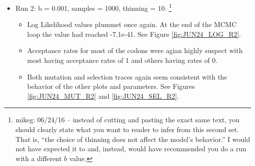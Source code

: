 \documentclass[11pt]{labbook}
\begin{document}
\begin{itemize}
        \begin{itemize}
            \item Log Likelihood values plummet once again. At the end of the MCMC loop the value had reached -1.8e-40. See Figure \ref{fig:JUN24_LOG_R1}.\footnote{mikeg: 06/24/16 -- You should use the \textbackslash label\{\} and \textbackslash ref\{\} commands rather than labeling and referring to figures using hard coded numbers.}
            \item Acceptance rates for most of the codons were highly suspect with most having acceptance rates of 1 and others having rates of 0.
            \item Both mutation and selection traces seem consistent with the behavior of the other plots and parameters. See Figures \ref{fig:JUN24_MUT_R1} and \ref{fig:JUN24_SEL_R1}.
        \end{itemize}
        \item Run 2: b = 0.001, samples = 1000, thinning = 10. 
          \footnote{mikeg: 06/24/16 -- instead of cutting and pasting the exact same text, you should clearly state what you want to reader to infer from this second set.
          That is, ``the choice of thinning does not affect the model's behavior.''
        I would not have expected it to and, instead, would have recommended you do a run with a different $b$ value.}
        \begin{itemize}
            \item Log Likelihood values plummet once again. At the end of the MCMC loop the value had reached -7.1e-41. See Figure \ref{fig:JUN24_LOG_R2}.
            \item Acceptance rates for most of the codons were agian highly suspect with most having acceptance rates of 1 and others having rates of 0.
            \item Both mutation and selection traces again seem consistent with the behavior of the other plots and parameters. See Figures \ref{fig:JUN24_MUT_R2} and \ref{fig:JUN24_SEL_R2}.
        \end{itemize}
    \end{itemize}
\end{document}
